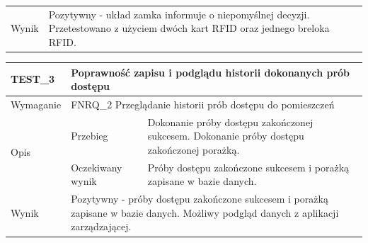 \begin{table}[h!]
\begin{subtable}[c]{\textwidth}
\begin{tabular}{p{2cm}|p{}|p{}}
                    Wynik                 & \multicolumn{2}{p{12cm}}{Pozytywny - układ zamka informuje o niepomyślnej decyzji. Przetestowano z użyciem dwóch kart RFID oraz jednego breloka RFID.}
                    \end{tabular}%
                \label{tbl:test2}
                \vspace{10mm}
            \end{subtable}
        \quad%
            \begin{subtable}[c]{\textwidth}
                \centering
                    \begin{tabular}{p{2cm}|p{}|p{}}
                    TEST\_3               & \multicolumn{2}{l}{\textbf{Poprawność zapisu i podglądu historii dokonanych prób dostępu}}                                                            \\ \hline
                    Wymaganie             & \multicolumn{2}{p{12cm}}{FNRQ\_2 Przeglądanie historii prób dostępu do pomieszczeń}                                                                                    \\ \hline
                    \multirow{2}{*}{Opis} & Przebieg           & Dokonanie próby dostępu zakończonej sukcesem. Dokonanie próby dostępu zakończonej porażką.                                    \\ \cline{2-3}
                                         & Oczekiwany wynik   & Próby dostępu zakończone sukcesem i porażką zapisane w bazie danych.                                                 \\ \hline
                    Wynik                 & \multicolumn{2}{p{12cm}}{Pozytywny - próby dostępu zakończone sukcesem i porażką zapisane w bazie danych. Możliwy podgląd danych z aplikacji zarządzającej.} \\
                    \end{tabular}%
                \label{tbl:test3}
                \vspace{10mm}
            \end{subtable}
            \label{tbl:tests}
        \end{table}

        \pagebreak

